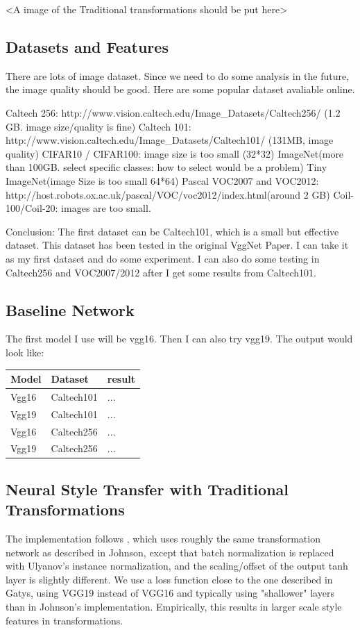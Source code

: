 \documentclass[a4paper,11pt]{article}
\begin{document}
<A image of the Traditional transformations should be put here>


\subsection{Datasets and Features}
There are lots of image dataset. Since we need to do some analysis in the future, the image quality should be good. Here are some popular dataset avaliable online.
\begin{outline}
\1 Caltech 256: http://www.vision.caltech.edu/Image\_Datasets/Caltech256/ (1.2 GB. image size/quality is fine)
\1 Caltech 101: http://www.vision.caltech.edu/Image\_Datasets/Caltech101/ (131MB, image quality)
\1 CIFAR10 / CIFAR100: image size is too small (32*32)
\1 ImageNet(more than 100GB. select specific classes: how to select would be a problem)
\1 Tiny ImageNet(image Size is too small 64*64)
\1 Pascal VOC2007 and VOC2012: http://host.robots.ox.ac.uk/pascal/VOC/voc2012/index.html(around 2 GB)
\1 Coil-100/Coil-20: images are too small.
\end{outline}
Conclusion: The first dataset can be Caltech101, which is a small but effective dataset. This dataset has been tested in the original VggNet Paper. I can take it as my first dataset and do some experiment. I can also do some testing in Caltech256 and VOC2007/2012 after I get some results from Caltech101.

\subsection{Baseline Network}
The first model I use will be vgg16. Then I can also try vgg19. The output would look like:
\begin{center}
    \begin{tabular}{| l | l | l |}
    \hline
    \textbf{Model} & \textbf{Dataset} & \textbf{result} \\ \hline
    Vgg16 & Caltech101 & ... \\ \hline
    Vgg19 & Caltech101 & ... \\ \hline
    Vgg16 & Caltech256 & ... \\ \hline
    Vgg19 & Caltech256 & ... \\ \hline
    \end{tabular}
\end{center}

\subsection{Neural Style Transfer with Traditional Transformations}
The implementation follows \cite{engstrom2016faststyletransfer}, which uses roughly the same transformation network as described in Johnson, except that batch normalization is replaced with Ulyanov's instance normalization, and the scaling/offset of the output tanh layer is slightly different. We use a loss function close to the one described in Gatys, using VGG19 instead of VGG16 and typically using "shallower" layers than in Johnson's implementation. Empirically, this results in larger scale style features in transformations. 
\end{document}
